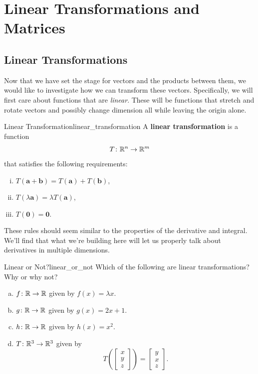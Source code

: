         
    \chapter{Linear Transformations and Matrices}
        \section{Linear Transformations}
        Now that we have set the stage for vectors and the products between them, we would like to investigate how we can transform these vectors.  Specifically, we will first care about functions that are \emph{linear}.  These will be functions that stretch and rotate vectors and possibly change dimension all while leaving the origin alone.
        
        \begin{df}{Linear Transformation}{linear_transformation}
        A \textbf{linear transformation}  is a function
        \[
        T\colon \mathbb{R}^n \to \mathbb{R}^m
        \]
        that satisfies the following requirements:
        \begin{enumerate}[(i)]
            \item $T(\mathbf{a}+\mathbf{b})=T(\mathbf{a})+T(\mathbf{b})$,
            \item $T(\lambda \mathbf{a})=\lambda T(\mathbf{a})$,
            \item $T(\mathbf{0})=\mathbf{0}$.
        \end{enumerate}
        \end{df}
        
        \begin{remark}
        These rules should seem similar to the properties of the derivative and integral.  We'll find that what we're building here will let us properly talk about derivatives in multiple dimensions.
        \end{remark}        
        
        \begin{ex}{Linear or Not?}{linear_or_not}
        Which of the following are linear transformations? Why or why not?
        \begin{enumerate}[(a)]
            \item $f\colon \mathbb{R} \to \mathbb{R}$ given by $f(x)=\lambda x$.
            \item $g\colon \mathbb{R} \to \mathbb{R}$ given by $g(x)=2x+1.$
            \item $h\colon \mathbb{R} \to \mathbb{R}$ given by $h(x)=x^2.$
            \item $T \colon \mathbb{R}^3 \to \mathbb{R}^3$ given by
            \[
            T\left( \begin{bmatrix} x\\ y\\ z \end{bmatrix} \right) = \begin{bmatrix} y\\ x\\ z \end{bmatrix}.
            \]
        \end{enumerate}
        \end{ex}
        
